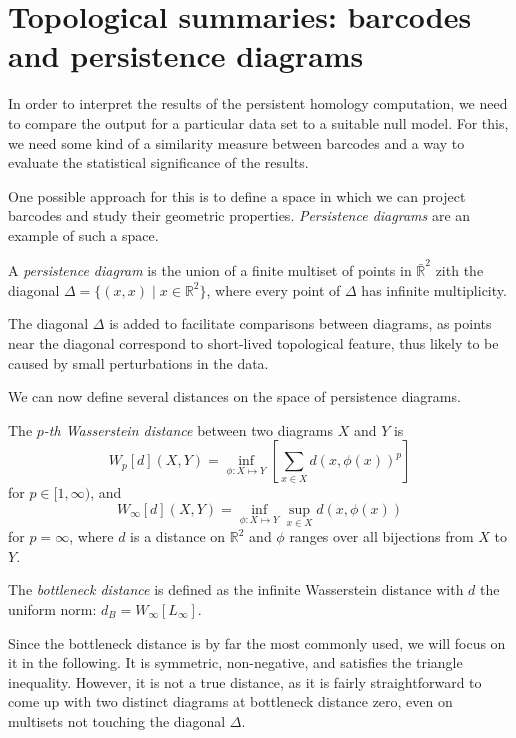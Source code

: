 \documentclass[a4paper,11pt,openany,extrafontsizes]{memoir}
\begin{document}
\section{Topological summaries: barcodes and persistence diagrams}%
\label{sec:topol-summ}

In order to interpret the results of the persistent homology
computation, we need to compare the output for a particular data set
to a suitable null model. For this, we need some kind of a similarity
measure between barcodes and a way to evaluate the statistical
significance of the results.

One possible approach for this is to define a space in which we can
project barcodes and study their geometric
properties. \emph{Persistence diagrams} are an example of such a
space.

\begin{defn}
  A \emph{persistence diagram} is the union of a finite multiset of
  points in $\bar{\mathbb{R}}^2$ zith the diagonal
  $\Delta = \{(x,x) \;|\; x\in\mathbb{R}^2\}$, where every point of
  $\Delta$ has infinite multiplicity.
\end{defn}

The diagonal $\Delta$ is added to facilitate comparisons between
diagrams, as points near the diagonal correspond to short-lived
topological feature, thus likely to be caused by small perturbations
in the data.

We can now define several distances on the space of persistence
diagrams.

\begin{defn}
  The \emph{$p$-th Wasserstein distance} between two diagrams $X$ and
  $Y$ is
  \[ W_p[d](X, Y) = \inf_{\phi:X\mapsto Y} \left[\sum_{x\in X} {d\left(x, \phi(x)\right)}^p\right] \]
  for $p\in [1,\infty)$, and
  \[ W_\infty[d](X, Y) = \inf_{\phi:X\mapsto Y} \sup_{x\in X} d\left(x,
      \phi(x)\right) \] for $p = \infty$, where $d$ is a distance on
  $\mathbb{R}^2$ and $\phi$ ranges over all bijections from $X$ to
  $Y$.
\end{defn}

\begin{defn}
  The \emph{bottleneck distance} is defined as the infinite
  Wasserstein distance with $d$ the uniform norm:
  $d_B = W_\infty[L_\infty]$.
\end{defn}

Since the bottleneck distance is by far the most commonly used, we
will focus on it in the following. It is symmetric, non-negative, and
satisfies the triangle inequality. However, it is not a true distance,
as it is fairly straightforward to come up with two distinct diagrams
at bottleneck distance zero, even on multisets not touching the
diagonal $\Delta$.
\end{document}
